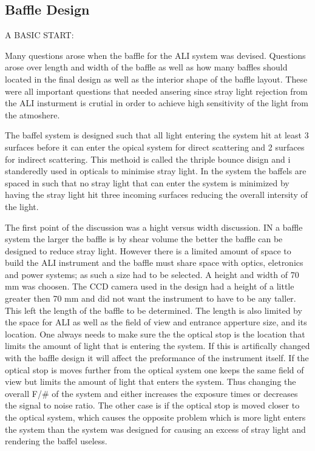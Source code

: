 \subsection{Baffle Design}

A BASIC START:

Many questions arose when the baffle for the ALI system was devised. Questions arose over length and width of the baffle as well as how many baffles should located in the final design as well as the interior shape of the baffle layout. These were all important questions that needed ansering since stray light rejection from the ALI insturment is crutial in order to achieve high sensitivity of the light from the atmoshere.

The baffel system is designed such that all light entering the system hit at least 3 surfaces before it can enter the opical system for direct scattering and 2 surfaces for indirect scattering. This methoid is called the thriple bounce disign and i standeredly used in opticals to minimise stray light. In the system the baffels are spaced in such that no stray light that can enter the system is minimized by having the stray light hit three incoming surfaces reducing the overall intersity of the light.

The first point of the discussion was a hight versus width discussion. IN a baffle system the larger the baffle is by shear volume the better the baffle can be designed to reduce stray light. However there is a limited amount of space to build the ALI instrument and the baffle must share space with optics, eletronics and power systems; as such a size had to be selected. A height and width of 70 mm was choosen. The CCD camera used in the design had a height of a little greater then 70 mm and did not want the instrument to have to be any taller. This left the length of the baffle to be determined. The length is also limited by the space for ALI as well as the field of view and entrance apperture size, and its location. One always needs to make sure the the optical stop is the location that limits the amount of light that is entering the system. If this is artifically changed with the baffle design it will affect the preformance of the instrument itself. If the optical stop is moves further from the optical system one keeps the same field of view but limits the amount of light that enters the system. Thus changing the overall F/\# of the system and either increases the exposure times or decreases the signal to noise ratio. The other case is if the optical stop is moved closer to the optical system, which causes the opposite problem which is more light enters the system than the system was designed for causing an excess of stray light and rendering the baffel useless.

